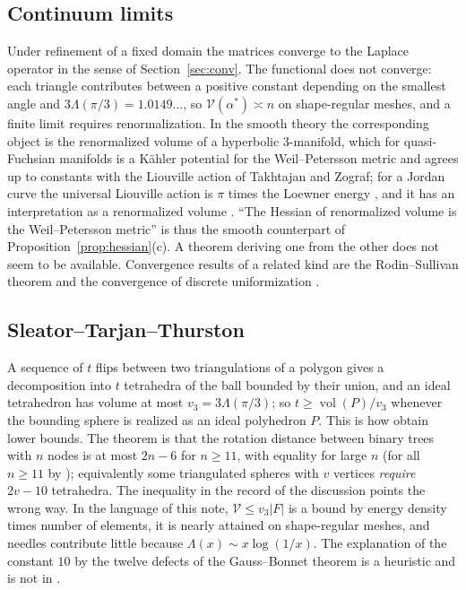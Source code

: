 \documentclass[11pt]{amsart}
\theoremstyle{definition}
\theoremstyle{remark}
\begin{document}
\subsection*{Continuum limits}
Under refinement of a fixed domain the matrices converge to the Laplace operator in the sense of Section~\ref{sec:conv}. The functional does not converge: each triangle contributes between a positive constant depending on the smallest angle and $3\Lambda(\pi/3)=1.0149\ldots$, so $\mathcal V(\alpha^*)\asymp n$ on shape-regular meshes, and a finite limit requires renormalization.
In the smooth theory the corresponding object is the renormalized volume of a hyperbolic $3$-manifold, which for quasi-Fuchsian manifolds is a K\"ahler potential for the Weil--Petersson metric \cite{KS08} and agrees up to constants with the Liouville action of Takhtajan and Zograf; for a Jordan curve the universal Liouville action \cite{TT06} is $\pi$ times the Loewner energy \cite{Wan19}, and it has an interpretation as a renormalized volume \cite{BBVW}.
``The Hessian of renormalized volume is the Weil--Petersson metric'' is thus the smooth counterpart of Proposition~\ref{prop:hessian}(c). A theorem deriving one from the other does not seem to be available. Convergence results of a related kind are the Rodin--Sullivan theorem \cite{RS87} and the convergence of discrete uniformization \cite{GLSW18,Spr20}.

\subsection*{Sleator--Tarjan--Thurston}
A sequence of $t$ flips between two triangulations of a polygon gives a decomposition into $t$ tetrahedra of the ball bounded by their union, and an ideal tetrahedron has volume at most $v_3=3\Lambda(\pi/3)$; so $t\ge\operatorname{vol}(P)/v_3$ whenever the bounding sphere is realized as an ideal polyhedron $P$.
This is how \cite{STT88} obtain lower bounds. The theorem is that the rotation distance between binary trees with $n$ nodes is at most $2n-6$ for $n\ge11$, with equality for large $n$ \cite{STT88} (for all $n\ge11$ by \cite{Pou14}); equivalently some triangulated spheres with $v$ vertices \emph{require} $2v-10$ tetrahedra. The inequality in the record of the discussion points the wrong way.
In the language of this note, $\mathcal V\le v_3|F|$ is a bound by energy density times number of elements, it is nearly attained on shape-regular meshes, and needles contribute little because $\Lambda(x)\sim x\log(1/x)$. The explanation of the constant $10$ by the twelve defects of the Gauss--Bonnet theorem is a heuristic and is not in \cite{STT88}.
\end{document}
